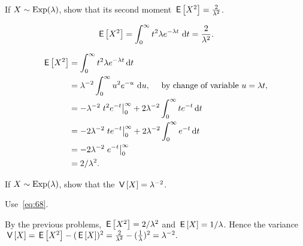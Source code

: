\begin{extra} 
  If $X\sim\operatorname{Exp}(\lambda)$, show that its second moment $\,\mathsf{E}\left[X^2\right] =  \frac{2}{\lambda^2}$.
\begin{hint}
  \begin{equation*}
  \,\mathsf{E}\left[X^2\right]= \int_0^\infty t^2 \lambda e^{-\lambda t}\, \,\text{d}t =  \frac{2}{\lambda^2}.
  \end{equation*}
\end{hint}
\begin{solution}
    \begin{align*}
\,\mathsf{E}\left[X^2\right] 
&= \int_0^\infty t^2 \lambda e^{-\lambda t} \,\text{d}t \\
&=   \lambda^{-2} \int_0^\infty u^2 e^{-u}\, \,\text{d}u, \quad \text{ by  change of variable $u=\lambda t$},   \\
&= -\lambda^{-2}\left. t^2 e^{- t}\right|_0^\infty + 2\lambda^{-2}\int_0^\infty t e^{- t} \,\text{d}t \\
&=  -2\lambda^{-2}\left. t e^{- t}\right|_0^\infty + 2\lambda^{-2} \int_0^\infty e^{- t} \,\text{d}t\\
&=  - 2\lambda^{-2} \left. e^{- t} \right|_0^\infty \\
&=  2/\lambda^2.
    \end{align*}
\end{solution}
\end{extra}


\begin{extra}
  If $X\sim\operatorname{Exp}(\lambda)$, show that the 
$\,\mathsf{V}\left[X\right] = \lambda^{-2}$.
\begin{hint} Use~\cref{eq:68}. 
\end{hint}
\begin{solution}
    By the previous problems, $\,\mathsf{E}\left[X^2\right]=2/\lambda^2$ and $\,\mathsf{E}\left[X\right] = 1/\lambda$. Hence the variance $\,\mathsf{V}\left[X\right] = \,\mathsf{E}\left[X^2\right] - (\,\mathsf{E}\left[X\right])^2 = \frac{2}{\lambda^2} - (\frac{1}{\lambda})^2 = \lambda^{-2}.$
\end{solution}
\end{extra}



